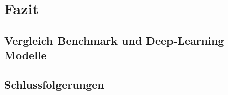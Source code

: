 \section{Fazit}

\subsection{Vergleich Benchmark und Deep-Learning Modelle}

\subsection{Schlussfolgerungen}